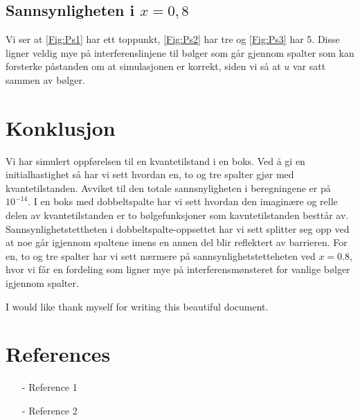 \documentclass[reprint,english,notitlepage]{revtex4-2}  %
\begin{document}
\subsection{Sannsynligheten i $x=0,8$}
Vi ser at \autoref{Fig:Ps1} har ett toppunkt, \autoref{Fig:Ps2} har tre og \autoref{Fig:Ps3} har 5. Disse ligner veldig mye på interferenslinjene til bølger som går gjennom spalter som kan forsterke påstanden om at simulasjonen er korrekt, siden vi så at $u$ var satt sammen av bølger. 
\section{Konklusjon}
Vi har simulert oppførelsen til en kvantetilstand i en boks. Ved å gi en initialhastighet så har vi sett hvordan en, to og tre spalter gjør med kvantetilstanden. Avviket til den totale sannsnyligheten i beregningene er på $10^{-14}$. I en boks med dobbeltspalte har vi sett hvordan den imaginære og relle delen av kvantetilstanden er to bølgefunksjoner som kavntetilstanden besttår av. Sannsynlighetstettheten i dobbeltspalte-oppsettet har vi sett splitter seg opp ved at noe går igjennom spaltene imens en annen del blir reflektert av barrieren. For en, to og tre spalter har vi sett nærmere på sannsynlighetstetteheten ved $x = 0.8$, hvor vi får en fordeling som ligner mye på interferensmønsteret for vanlige bølger igjennom spalter.
\begin{acknowledgments}  %
I would like thank myself for writing this beautiful document.
\end{acknowledgments}


\section*{References}  %
\begin{itemize}
\item[-]Reference 1
\item[-]Reference 2
\end{itemize}
\end{document}
